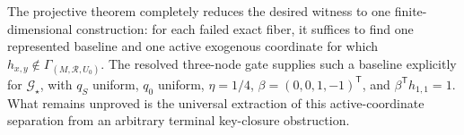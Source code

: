 The projective theorem completely reduces the desired witness to one finite-dimensional construction: for each failed exact fiber, it suffices to find one represented baseline and one active exogenous coordinate for which \(h_{x,y}\notin\Gamma_{(M,\mathcal R,U_0)}\).  The resolved three-node gate supplies such a baseline explicitly for \(\mathcal G_\star\), with \(q_S\) uniform, \(q_0\) uniform, \(\eta=1/4\), \(\beta=(0,0,1,-1)^{\mathsf T}\), and \(\beta^{\mathsf T}h_{1,1}=1\).  What remains unproved is the universal extraction of this active-coordinate separation from an arbitrary terminal key-closure obstruction.